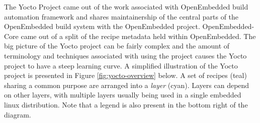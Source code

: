 The Yocto Project came out of the work associated with OpenEmbedded build automation framework and shares maintainership of the central parts of the OpenEmbedded build system with the OpenEmbedded project. OpenEmbedded-Core came out of a split of the recipe metadata held within OpenEmbedded. The big picture of the Yocto project can be fairly complex and the amount of terminology and techniques associated with using the project causes the Yocto project to have a steep learning curve. A simplified illustration of the Yocto project is presented in Figure \ref{fig:yocto-overview} below. A set of recipes (teal) sharing a common purpose are arranged into a \textit{layer} (cyan). Layers can depend on other layers, with multiple layers usually being used in a single embedded linux distribution. Note that a legend is also present in the bottom right of the diagram.

